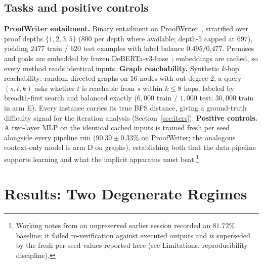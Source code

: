\documentclass[11pt]{article}
\begin{document}
\subsection{Tasks and positive controls}
\textbf{ProofWriter entailment.} Binary entailment on
ProofWriter~\citep{tafjord2021proofwriter}, stratified over proof
depths $\{1,2,3,5\}$ ($800$ per depth where available; depth-5
capped at $697$), yielding $2477$ train / $620$ test examples with
label balance $0.495/0.477$. Premises and goals are embedded by frozen
DeBERTa-v3-base~\citep{he2023debertav3}; embeddings are cached, so
every method reads identical inputs. \textbf{Graph reachability.}
Synthetic $k$-hop reachability: random directed graphs on $16$ nodes
with out-degree $2$; a query $(s,t,k)$ asks whether $t$ is reachable
from $s$ within $k\le 8$ hops, labeled by breadth-first search and
balanced exactly ($6{,}000$ train / $1{,}000$ test; $30{,}000$ train
in arm E). Every instance carries its true BFS distance, giving a
ground-truth difficulty signal for the iteration analysis
(Section~\ref{sec:iters}). \textbf{Positive controls.} A two-layer
MLP on the identical cached inputs is trained fresh per seed alongside
every pipeline run ($90.39\pm0.33\%$ on ProofWriter; the analogous
context-only model is arm D on graphs), establishing both that the
data pipeline supports learning and what the implicit apparatus must
beat.\footnote{Working notes from an unpreserved earlier session
recorded an $81.72\%$ baseline; it failed re-verification against
executed outputs and is superseded by the fresh per-seed values
reported here (see Limitations, reproducibility discipline).}

\section{Results: Two Degenerate Regimes}\label{sec:collapse}
\end{document}
